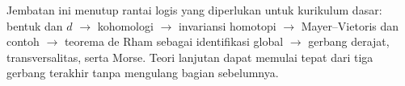 \begin{bemerkung}\label{o011-br-rem-roadmap}
Jembatan ini menutup rantai logis yang diperlukan untuk kurikulum dasar:
bentuk dan $d$ $\to$ kohomologi $\to$ invariansi homotopi $\to$
Mayer--Vietoris dan contoh $\to$ teorema de Rham sebagai identifikasi global
$\to$ gerbang derajat, transversalitas, serta Morse. Teori lanjutan dapat
memulai tepat dari tiga gerbang terakhir tanpa mengulang bagian sebelumnya.
\end{bemerkung}
